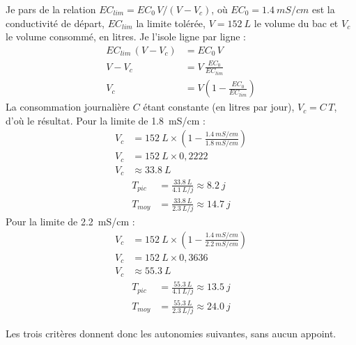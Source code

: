 \begin{demonstration}
Je pars de la relation $EC_{lim} = EC_0\,V/(V - V_c)$, où $EC_0 = \qty{1,4}{mS/cm}$ est la conductivité de départ, $EC_{lim}$ la limite tolérée, $V = \qty{152}{L}$ le volume du bac et $V_c$ le volume consommé, en litres. Je l'isole ligne par ligne :
\begin{align*}
EC_{lim}\,(V - V_c) &= EC_0\,V\\
V - V_c &= V\,\frac{EC_0}{EC_{lim}}\\
V_c &= V\left(1 - \frac{EC_0}{EC_{lim}}\right)
\end{align*}
La consommation journalière $C$ étant constante (en litres par jour), $V_c = C\,T$, d'où le résultat. Pour la limite de \qty{1,8}{mS/cm} :
\begin{align*}
V_c &= \qty{152}{L}\times\left(1 - \frac{\qty{1,4}{mS/cm}}{\qty{1,8}{mS/cm}}\right)\\
V_c &= \qty{152}{L}\times0{,}2222\\
V_c &\approx \qty{33,8}{L}
\end{align*}
\begin{align*}
T_{pic} &= \frac{\qty{33,8}{L}}{\qty{4,1}{L/j}} \approx \qty{8,2}{j}\\
T_{moy} &= \frac{\qty{33,8}{L}}{\qty{2,3}{L/j}} \approx \qty{14,7}{j}
\end{align*}
Pour la limite de \qty{2,2}{mS/cm} :
\begin{align*}
V_c &= \qty{152}{L}\times\left(1 - \frac{\qty{1,4}{mS/cm}}{\qty{2,2}{mS/cm}}\right)\\
V_c &= \qty{152}{L}\times0{,}3636\\
V_c &\approx \qty{55,3}{L}
\end{align*}
\begin{align*}
T_{pic} &= \frac{\qty{55,3}{L}}{\qty{4,1}{L/j}} \approx \qty{13,5}{j}\\
T_{moy} &= \frac{\qty{55,3}{L}}{\qty{2,3}{L/j}} \approx \qty{24,0}{j}
\end{align*}
\end{demonstration}

Les trois critères donnent donc les autonomies suivantes, sans aucun appoint.

